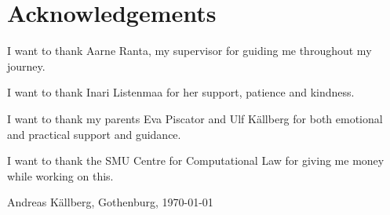 \thispagestyle{plain}			%
\section*{Acknowledgements}

I want to thank Aarne Ranta, my supervisor for guiding me throughout my journey.

I want to thank Inari Listenmaa for her support, patience and kindness.

I want to thank my parents Eva Piscator and Ulf Källberg for both emotional and practical support and guidance.

I want to thank the SMU Centre for Computational Law for giving me money while working on this.


\vspace{1.5cm}
\hfill
Andreas Källberg, Gothenburg, \today

\newpage				%
\thispagestyle{empty}
\mbox{}
